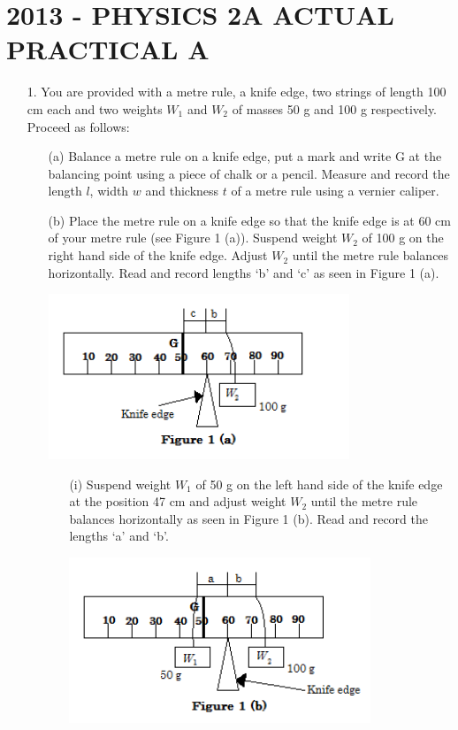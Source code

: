 \section{2013 - PHYSICS 2A ACTUAL PRACTICAL A \hfill}

\begin{enumerate}
\item[1.] You are provided with a metre rule, a knife edge, two strings of length 100 cm each and two weights $W_1$ and $W_2$ of masses 50 g and 100 g respectively. Proceed as follows:
\begin{enumerate}
\item[(a)] Balance a metre rule on a knife edge, put a mark and write G at the balancing point using a piece of chalk or a pencil. Measure and record the length $l$, width $w$ and thickness $t$ of a metre rule using a vernier caliper.
\item[(b)] Place the metre rule on a knife edge so that the knife edge is at 60 cm of your metre rule (see Figure 1 (a)). Suspend weight $W_2$ of 100 g on the right hand side of the knife edge. Adjust $W_2$ until the metre rule balances horizontally. Read and record lengths `b' and `c' as seen in Figure 1 (a).

\begin{center}
\includegraphics[width=9cm]{./img/2013-1a-alt.png}
\end{center}

\begin{enumerate}
\item[(i)] Suspend weight $W_1$ of 50 g on the left hand side of the knife edge at the position 47 cm and adjust weight $W_2$ until the metre rule balances horizontally as seen in Figure 1 (b). Read and record the lengths `a' and `b'.

\begin{center}
\includegraphics[width=9cm]{./img/2013-1b-alt.png}
\end{center}


\end{enumerate}
\end{enumerate}
\end{enumerate}
